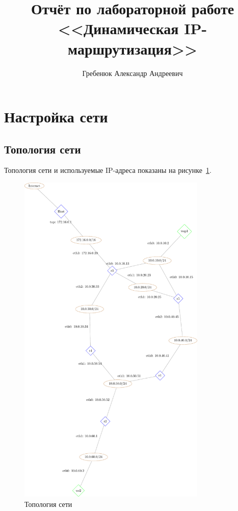 \documentclass[a4paper,12pt]{article}
\title{Отчёт по лабораторной работе \\ <<Динамическая IP-маршрутизация>>}
\author{Гребенюк Александр Андреевич}
\begin{document}
\maketitle

\tableofcontents

\clearpage

\section{Настройка сети}

\subsection{Топология сети}

Топология сети и используемые IP-адреса показаны на рисунке~\ref{fig:network}.

\begin{figure}[h!]
\centering
\includegraphics[width=0.8\textwidth]{includes/network_gv.pdf}
\caption{Топология сети}
\label{fig:network}
\end{figure}
\end{document}
